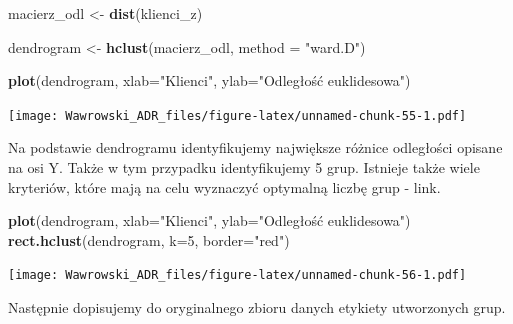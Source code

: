 \documentclass[]{book}
\newenvironment{Shaded}{\begin{snugshade}}{\end{snugshade}}
\newcommand{\DataTypeTok}[1]{\textcolor[rgb]{0.13,0.29,0.53}{#1}}
\newcommand{\DecValTok}[1]{\textcolor[rgb]{0.00,0.00,0.81}{#1}}
\newcommand{\KeywordTok}[1]{\textcolor[rgb]{0.13,0.29,0.53}{\textbf{#1}}}
\newcommand{\NormalTok}[1]{#1}
\newcommand{\OperatorTok}[1]{\textcolor[rgb]{0.81,0.36,0.00}{\textbf{#1}}}
\newcommand{\StringTok}[1]{\textcolor[rgb]{0.31,0.60,0.02}{#1}}
\begin{document}
\begin{Shaded}
\begin{Highlighting}[]
\NormalTok{macierz_odl <-}\StringTok{ }\KeywordTok{dist}\NormalTok{(klienci_z)}

\NormalTok{dendrogram <-}\StringTok{ }\KeywordTok{hclust}\NormalTok{(macierz_odl, }\DataTypeTok{method =} \StringTok{"ward.D"}\NormalTok{)}

\KeywordTok{plot}\NormalTok{(dendrogram, }\DataTypeTok{xlab=}\StringTok{"Klienci"}\NormalTok{, }\DataTypeTok{ylab=}\StringTok{"Odległość euklidesowa"}\NormalTok{)}
\end{Highlighting}
\end{Shaded}

\texttt{[image: Wawrowski\_ADR\_files/figure-latex/unnamed-chunk-55-1.pdf]}

Na podstawie dendrogramu identyfikujemy największe różnice odległości opisane na osi Y. Także w tym przypadku identyfikujemy 5 grup. Istnieje także wiele kryteriów, które mają na celu wyznaczyć optymalną liczbę grup - link.

\begin{Shaded}
\begin{Highlighting}[]
\KeywordTok{plot}\NormalTok{(dendrogram, }\DataTypeTok{xlab=}\StringTok{"Klienci"}\NormalTok{, }\DataTypeTok{ylab=}\StringTok{"Odległość euklidesowa"}\NormalTok{)}
\KeywordTok{rect.hclust}\NormalTok{(dendrogram, }\DataTypeTok{k=}\DecValTok{5}\NormalTok{, }\DataTypeTok{border=}\StringTok{"red"}\NormalTok{)}
\end{Highlighting}
\end{Shaded}

\texttt{[image: Wawrowski\_ADR\_files/figure-latex/unnamed-chunk-56-1.pdf]}

Następnie dopisujemy do oryginalnego zbioru danych etykiety utworzonych grup.

\begin{Shaded}
\end{Shaded}
\end{document}
